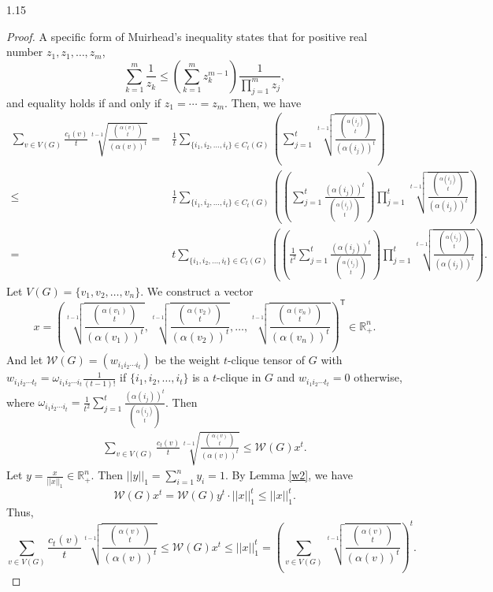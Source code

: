 \documentclass[preprint,12pt]{elsarticle1}
\numberwithin{equation}{section}
\begin{document}
\begin{spacing}{1.15}
\begin{proof}
A specific form of Muirhead's inequality states that for positive real number $z_1,z_1,\ldots,z_m$,
$$\sum_{k=1}^{m}\frac{1}{z_k}\le\left(\sum_{k=1}^{m}z_k^{m-1}\right)\frac{1}{\prod_{j=1}^{m}z_j},$$ and equality holds if and only if $z_1=\cdots=z_m$.
Then, we have
\begin{align*}
	 \sum_{v\in V(G)}\frac{c_t(v)}{t}\sqrt[t-1]{\frac{\binom{\alpha(v)}{t}}{\left(\alpha(v)\right)^t}}
= & \frac{1}{t} \sum_{\{i_1,i_2,\ldots,i_t\}\in C_t(G)}\left( \sum_{j=1}^{t} \sqrt[t-1]{\frac{\binom{\alpha(i_j)}{t}}{\left(\alpha(i_j)\right)^t}} \right)\\
\le & \frac{1}{t} \sum_{\{i_1,i_2,\ldots,i_t\}\in C_t(G)} \left( \left( \sum_{j=1}^{t} \frac{\left(\alpha(i_j)\right)^t}{\binom{\alpha(i_j)}{t}} \right) \prod_{j=1}^{t}\sqrt[t-1]{\frac{\binom{\alpha(i_j)}{t}}{\left(\alpha(i_j)\right)^t}} \right)\\
= & t \sum_{\{i_1,i_2,\ldots,i_t\}\in C_t(G)} \left( \left( \frac{1}{t^2} \sum_{j=1}^{t} \frac{\left(\alpha(i_j)\right)^t}{\binom{\alpha(i_j)}{t}} \right) \prod_{j=1}^{t}\sqrt[t-1]{\frac{\binom{\alpha(i_j)}{t}}{\left(\alpha(i_j)\right)^t}} \right).
\end{align*}
Let $V(G)=\{v_1,v_2,\ldots,v_n\}$. We construct a vector
$$x=\left( \sqrt[t-1]{\frac{\binom{\alpha(v_1)}{t}}{\left(\alpha(v_1)\right)^t}}, \sqrt[t-1]{\frac{\binom{\alpha(v_2)}{t}}{\left(\alpha(v_2)\right)^t}}, \ldots, \sqrt[t-1]{\frac{\binom{\alpha(v_n)}{t}}{\left(\alpha(v_n)\right)^t}} \right)^{\mathsf{T}}\in\mathbb{R}^{n}_{+}.$$
And let $\mathcal{W}(G)=(w_{i_1i_2\cdots i_t})$ be the weight $t$-clique tensor of $G$ with $w_{i_1i_2\cdots t_t}=\omega_{i_1i_2\cdots i_t}\frac{1}{(t-1)!}$ if $\{i_1,i_2,\ldots,i_t\}$ is a $t$-clique in $G$ and $w_{i_1i_2\cdots t_t}=0$ otherwise, where $\omega_{i_1i_2\cdots i_t}=\frac{1}{t^2} \sum_{j=1}^{t} \frac{\left(\alpha(i_j)\right)^t}{\binom{\alpha(i_j)}{t}}$.
Then
\begin{align*}
	\sum_{v\in V(G)}\frac{c_t(v)}{t}\sqrt[t-1]{\frac{\binom{\alpha(v)}{t}}{\left(\alpha(v)\right)^t}}\le \mathcal{W}(G)x^{t}.
\end{align*}
Let $y=\frac{x}{||x||_{1}}\in\mathbb{R}^{n}_{+}$. Then $||y||_{1}=\sum_{i=1}^{n}y_i=1$. By Lemma \ref{w2}, we have
$$\mathcal{W}(G)x^t=\mathcal{W}(G)y^t \cdot ||x||_{1}^{t}\le ||x||_{1}^{t}.$$
Thus,
$$	\sum_{v\in V(G)}\frac{c_t(v)}{t}\sqrt[t-1]{\frac{\binom{\alpha(v)}{t}}{\left(\alpha(v)\right)^t}} \le \mathcal{W}(G)x^{t} \le ||x||_{1}^{t} = \left( \sum_{v\in V(G)}\sqrt[t-1]{\frac{\binom{\alpha(v)}{t}}{\left(\alpha(v)\right)^t}} \right)^{t}.$$


\end{proof}
\end{spacing}
\end{document}
